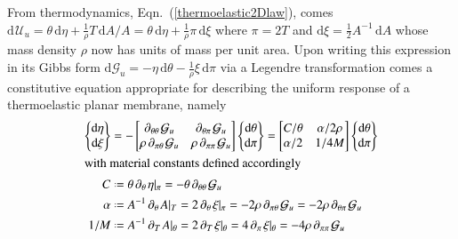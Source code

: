 From thermo\-dynamics, Eqn.~(\ref{thermoelastic2Dlaw}), comes $\mathrm{d}\hspace{1pt}\mathcal{U}_u = \theta \, \mathrm{d} \eta + \tfrac{1}{\rho} T \, \mathrm{d}A / \! A = \theta \, \mathrm{d} \eta + \tfrac{1}{\rho} \pi \, \mathrm{d}\xi$ where $\pi = 2T$ and $\mathrm{d}\xi = \tfrac{1}{2} A^{-1} \, \mathrm{d}A$ whose mass density $\rho$ now has units of mass per unit area.  Upon writing this expression in its Gibbs form $\mathrm{d} \mathcal{G}_u = -\eta \, \mathrm{d} \theta - \tfrac{1}{\rho} \xi \, \mathrm{d} \pi$ via a Legendre transformation comes a constitutive equation appropriate for describing the uniform response of a thermo\-elastic planar membrane, namely
\begin{subequations}
    \label{uniformMembraneModel}
    \begin{align}
\left\{ \begin{matrix}
\mathrm{d} \eta \\ \mathrm{d} \xi
\end{matrix} \right\} & = -\begin{bmatrix}
\partial_{\theta\theta\,} \mathcal{G}_u & \partial_{\theta\pi\,} \mathcal{G}_u \\
\rho \, \partial_{\pi\theta\,} \mathcal{G}_u & \rho \, \partial_{\pi\pi\,} \mathcal{G}_u
\end{bmatrix} 
\left\{ \begin{matrix}
\mathrm{d} \theta \\ \mathrm{d} \pi
\end{matrix} \right\} = \begin{bmatrix}
C / \theta & \alpha / 2 \rho \\ \alpha / 2 & 1 / 4 M
\end{bmatrix} \left\{ \begin{matrix}
\mathrm{d} \theta \\ \mathrm{d} \pi
\end{matrix} \right\}
\label{thermoelasticCE2D} \\
\intertext{with material constants defined accordingly}
    C & \defeq \theta \, \partial_{\theta\,} \eta |_{\pi} = -\theta \, \partial_{\theta\theta\,} \mathcal{G}_u \\
    \alpha & \defeq A^{-1} \, \partial_{\theta\,} A |_T = 2 \, \partial_{\theta\,} \xi |_{\pi} = -2\rho \, \partial_{\pi\theta\,} \mathcal{G}_u = -2\rho \, \partial_{\theta\pi\,} \mathcal{G}_u \\
    1/M & \defeq A^{-1} \, \partial_{T\,} A |_{\theta} = 2 \, \partial_{T\,} \xi |_{\theta} = 4 \, \partial_{\pi\,} \xi |_{\theta} = -4\rho \, \partial_{\pi\pi\,} \mathcal{G}_u
    \end{align}
\end{subequations}

